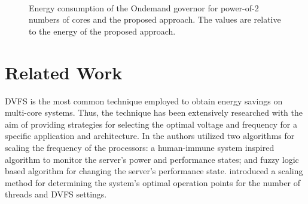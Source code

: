 \begin{figure}[H]
    \centering
	\\
	\\
	\\
    \caption{Energy consumption of the Ondemand governor for power-of-2 numbers of cores and the proposed approach. The values are relative to the energy of the proposed approach.}
    \label{fig:energy_results}
\end{figure}




\section{Related Work} \label{sec:relatedwork}
DVFS is the most common technique employed to obtain energy savings on multi-core systems. Thus, the technique has been extensively researched with the aim of providing strategies for selecting the optimal voltage and frequency for a specific application and architecture. In \cite{Anghel2011} the authors utilized two algorithms for scaling the frequency of the processors: a human-immune system inspired algorithm to monitor the server's power and performance states; and fuzzy logic based algorithm for changing the server's performance state. \cite{Cochran2011} introduced a scaling method for determining the system's optimal operation points for the number of threads and DVFS settings.

